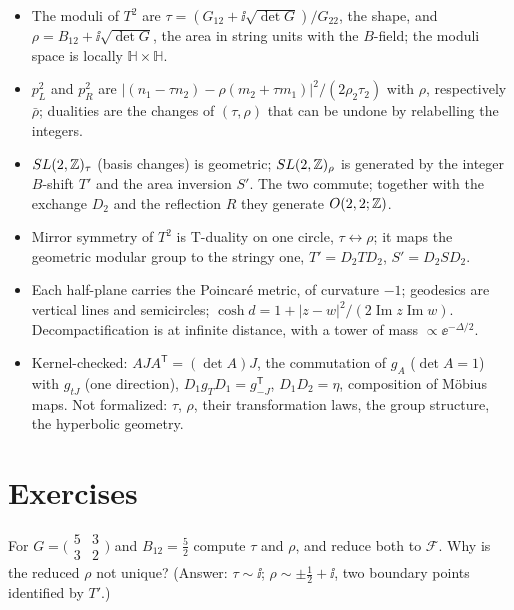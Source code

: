 \begin{summarybox}
\begin{itemize}[nosep,leftmargin=*]
\item The moduli of $T^2$ are $\tau=(G_{12}+\ii\sqrt{\det G})/G_{22}$, the shape, and
$\rho=B_{12}+\ii\sqrt{\det G}$, the area in string units with the $B$-field; the moduli space
is locally $\mathbb H\times\mathbb H$.
\item $p_L^2$ and $p_R^2$ are $|(n_1-\tau n_2)-\rho(m_2+\tau m_1)|^2/(2\rho_2\tau_2)$ with
$\rho$, respectively $\bar\rho$; dualities are the changes of $(\tau,\rho)$ that can be undone
by relabelling the integers.
\item $SL(2,\mathbb{Z})_\tau$ (basis changes) is geometric; $SL(2,\mathbb{Z})_\rho$ is generated by the
integer $B$-shift $T'$ and the area inversion $S'$. The two commute; together with the
exchange $D_2$ and the reflection $R$ they generate $O(2,2;\mathbb{Z})$.
\item Mirror symmetry of $T^2$ is T-duality on one circle, $\tau\leftrightarrow\rho$; it maps
the geometric modular group to the stringy one, $T'=D_2TD_2$, $S'=D_2SD_2$.
\item Each half-plane carries the Poincar\'e metric, of curvature $-1$; geodesics are
vertical lines and semicircles; $\cosh d=1+|z-w|^2/(2\operatorname{Im}z\operatorname{Im}w)$.
Decompactification is at infinite distance, with a tower of mass $\propto\ee^{-\Delta/2}$.
\item Kernel-checked: $AJA^{\mathsf T}=(\det A)J$, the commutation of $g_A$ ($\det A=1$) with
$g_{tJ}$ (one direction), $D_1g_TD_1=g_{-J}^{\mathsf T}$, $D_1D_2=\eta$, composition of M\"obius
maps. Not formalized: $\tau$, $\rho$, their transformation laws, the group structure, the
hyperbolic geometry.
\end{itemize}
\end{summarybox}

\section*{Exercises}

\begin{exercise}[$\star$]
For $G=\big(\begin{smallmatrix}5&3\\3&2\end{smallmatrix}\big)$ and $B_{12}=\frac52$ compute
$\tau$ and $\rho$, and reduce both to $\mathcal F$. Why is the reduced $\rho$ not unique?
(Answer: $\tau\sim\ii$; $\rho\sim\pm\frac12+\ii$, two boundary points identified by $T'$.)
\end{exercise}

